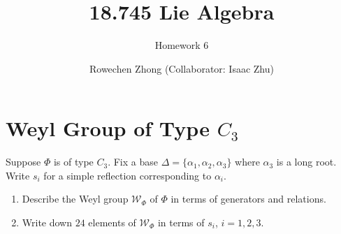 \documentclass[11pt, headheight=30pt]{scrartcl}
\author{Rowechen Zhong (Collaborator: Isaac Zhu)}
\title{18.745 Lie Algebra}
\subtitle{Homework 6}
\begin{document}
\section{Weyl Group of Type $C_3$}

\begin{prob*}
Suppose $\Phi$ is of type $C_3$. Fix a base $\Delta = \{\alpha_1, \alpha_2, \alpha_3\}$ where $\alpha_3$ is a long root. Write $s_i$ for a simple reflection corresponding to $\alpha_i$.
\begin{enumerate}[(1)]
    \item Describe the Weyl group $\mathcal{W}_\Phi$ of $\Phi$ in terms of generators and relations.
    \item Write down $24$ elements of $\mathcal{W}_\Phi$ in terms of $s_i$, $i = 1, 2, 3$.
\end{enumerate}
\end{prob*}
\end{document}
